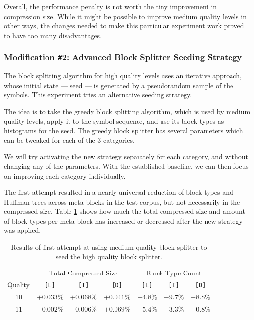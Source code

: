 \documentclass[english,master,dept460,male,cpp,cpdeclaration]{diploma}
\begin{document}
		\noindent
		Overall, the performance penalty is not worth the tiny improvement in compression size. While it might be possible to improve medium quality levels in other ways, the changes needed to make this particular experiment work proved to have too many disadvantages.
		
		\subsubsection{Modification \texttt{\#}2: Advanced Block Splitter Seeding Strategy}
		
		The block splitting algorithm for high quality levels uses an iterative approach, whose initial state --- seed --- is generated by a pseudorandom sample of the symbols. This experiment tries an alternative seeding strategy.
			
		The idea is to take the greedy block splitting algorithm, which is used by medium quality levels, apply it to the symbol sequence, and use its block types as histograms for the seed. The greedy block splitter has several parameters which can be tweaked for each of the 3 categories.
		
		We will try activating the new strategy separately for each category, and without changing any of the parameters. With the established baseline, we can then focus on improving each category individually.
		
		The first attempt resulted in a nearly universal reduction of block types and Huffman trees across meta-blocks in the test corpus, but not necessarily in the compressed size. Table \ref{table:experiment-seed-block-split-mix-1} shows how much the total compressed size and amount of block types per meta-block has increased or decreased after the new strategy was applied.
		
		\begin{table}[H]
			\centering
			\caption{Results of first attempt at using medium quality block splitter to seed the high quality block splitter.}
			\label{table:experiment-seed-block-split-mix-1}
			
			\newcommand{\cat}[1]{\multicolumn{1}{c|}{\texttt{[#1]}}}
			\newcommand{\catl}[1]{\multicolumn{1}{c||}{\texttt{[#1]}}}
			
			\begin{tabular}{|c||r|r|r||r|r|r|}
				\hline
				        & \multicolumn{3}{c||}{Total Compressed Size} & \multicolumn{3}{c|}{Block Type Count} \\ \cline{2-7}
				Quality &     \cat{L} &     \cat{I} &        \catl{D} &   \cat{L} &   \cat{I} &       \cat{D} \\ \hline
				  10    & $+0.033 \%$ & $+0.068 \%$ &     $+0.041 \%$ & $-4.8 \%$ & $-9.7 \%$ &     $-8.8 \%$ \\
				  11    & $-0.002 \%$ & $-0.006 \%$ &     $+0.069 \%$ & $-5.4 \%$ & $-3.3 \%$ &     $+0.8 \%$ \\ \hline
			\end{tabular}
		\end{table}
		
\end{document}
